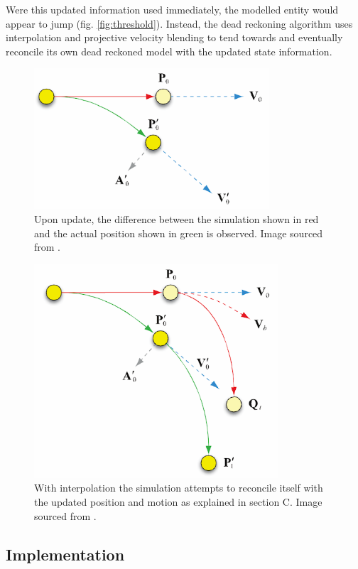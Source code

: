 \documentclass[journal]{IEEEtran}
\begin{document}
Were this updated information used immediately, the modelled entity would appear to jump (fig. \ref{fig:threshold}). Instead, the dead reckoning algorithm uses interpolation and projective velocity blending \cite{murphy2011believable} to tend towards and eventually reconcile its own dead reckoned model with the updated state information.

\begin{figure}[h]
    \centering
    \includegraphics[width=0.7\linewidth]{DR2.png}
    \caption{Upon update, the difference between the simulation shown in red and the actual position shown in green is observed. Image sourced from \cite{murphy2011believable}.}
    \label{fig:dr2}
\end{figure}

\begin{figure}[h]
    \centering
    \includegraphics[width=0.7\linewidth]{DR3.png}
    \caption{With interpolation the simulation attempts to reconcile itself with the updated position and motion as explained in section C. Image sourced from \cite{murphy2011believable}.}
    \label{fig:dr3}
\end{figure}

\subsection{Implementation}
\end{document}
